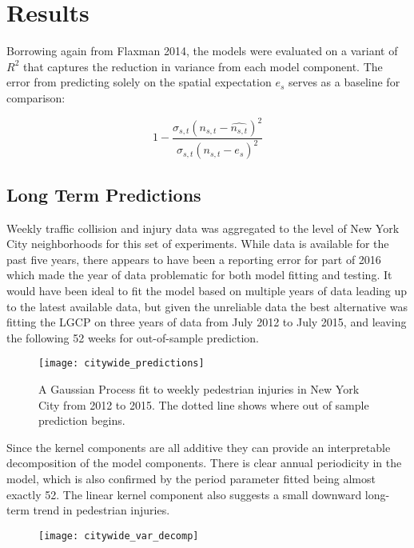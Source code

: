 \section{Results}
\label{results}

Borrowing again from Flaxman 2014, the models were evaluated on a variant of $R^2$ that captures the reduction in variance from each model component. The error from predicting solely on the spatial expectation $e_s$ serves as a baseline for comparison:

$$ 1 - \frac{\sigma_{s,t}(n_{s,t}- \hat{n_{s,t}})^2}{\sigma_{s,t}(n_{s,t} - e_{s})^2}$$


\subsection{Long Term Predictions}

 Weekly traffic collision and injury data was aggregated to the level of New York City neighborhoods for this set of experiments. While data is available for the past five years, there appears to have been a reporting error for part of 2016 which made the year of data problematic for both model fitting and testing. It would have been ideal to fit the model based on multiple years of data leading up to the latest available data, but given the unreliable data the best alternative was fitting the LGCP on three years of data from July 2012 to July 2015, and leaving the following 52 weeks for out-of-sample prediction.  \par


 \begin{figure}[h!]
   \caption{A Gaussian Process fit to weekly pedestrian injuries in New York City from 2012 to 2015. The dotted line shows where out of sample prediction begins.}
   \texttt{[image: citywide\_predictions]}
 \end{figure}


Since the kernel components are all additive they can provide an interpretable decomposition of the model components. There is clear annual periodicity in the model, which is also confirmed by the period parameter fitted being almost exactly 52. The linear kernel component also suggests a small downward long-term trend in pedestrian injuries.



\begin{figure}[h!]
  \caption{}
  \texttt{[image: citywide\_var\_decomp]}
\end{figure}

